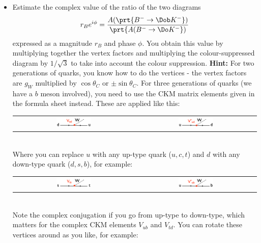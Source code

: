 \begin{enumerate}[a)]
\begin{itemize}
{ }
 \item Estimate the complex value of the ratio of the two diagrams
  \[
    r_B e^{i\phi} = \frac{A(\prt{B^- \to \Dob K^-})}{\prt{A(B^- \to \Do K^-})}
 \]
 expressed as a magnitude $r_B$ and phase $\phi$. You obtain this value
 by multiplying together the vertex factors and multiplying the colour-suppressed diagram by $1/\sqrt{3}$ to take into account the colour suppression. {\bf Hint:} For two generations of quarks, you know how to do the vertices - the vertex factors are $g_{W}$ multiplied by $\cos{\theta_C}$ or $\pm \sin\theta_C$. For three generations of quarks (we have a $b$ meson involved), you need to use the CKM matrix elements given in the formula sheet instead. These are applied like this:
 \\
 \begin{tabular}{cc}
 \includegraphics[width=0.3\textwidth]{problemsheets/ps2figs/CKM_Vud}
 &
 \includegraphics[width=0.3\textwidth]{problemsheets/ps2figs/CKM_Vudstar}
\end{tabular}\\
 Where you can replace $u$ with any up-type quark ($u, c, t$) and $d$ with any down-type quark ($d, s, b$), for example:
 \\
 \begin{tabular}{cc}
 \includegraphics[width=0.3\textwidth]{problemsheets/ps2figs/CKM_Vts}
 &
 \includegraphics[width=0.3\textwidth]{problemsheets/ps2figs/CKM_Vubstar}
 \end{tabular}\\
 Note the complex conjugation if you go from up-type to down-type, which matters for the complex CKM elements $V_{ub}$ and $V_{td}$. You can rotate these vertices around as you like, for example:
 \\
 \begin{tabular}{cccc}

\end{tabular}
\end{itemize}
\end{enumerate}
